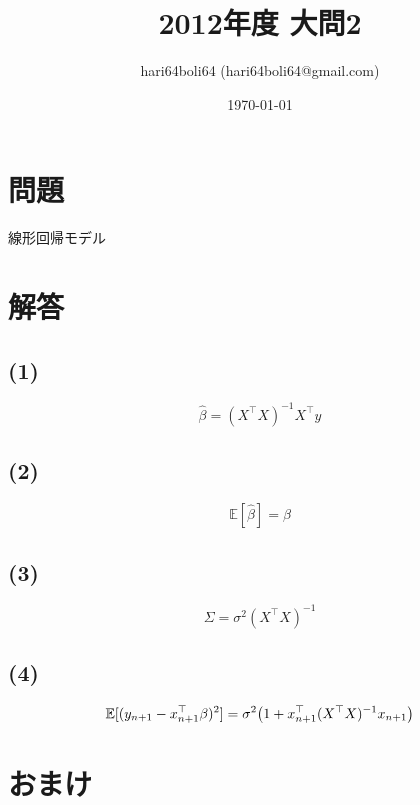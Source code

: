 \documentclass[a4paper, 10pt, dvipdfmx]{jlreq}
\begin{document}
\title{2012年度 大問2}
\author{hari64boli64 (hari64boli64@gmail.com)}
\date{\today}
\maketitle

\section{問題}

線形回帰モデル

\section{解答}

\subsection*{(1)}

\begin{equation*}
  \hat{\beta}=(X^\top X)^{-1}X^\top y
\end{equation*}

\subsection*{(2)}

\begin{equation*}
  \mathbb{E}[\hat{\beta}] =\beta
\end{equation*}

\subsection*{(3)}

\begin{equation*}
  \Sigma=\sigma^2(X^\top X)^{-1}
\end{equation*}

\subsection*{(4)}

\begin{equation*}
  \mathbb{E}[(y_{n+1}-x_{n+1}^\top \beta)^2]=\sigma^2\qty(1+x_{n+1}^\top (X^\top X)^{-1}x_{n+1})
\end{equation*}

\section{おまけ}
\end{document}
